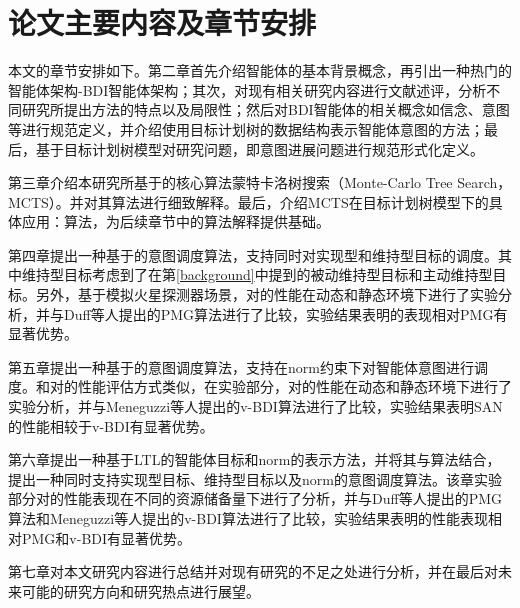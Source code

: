 \section{论文主要内容及章节安排}
本文的章节安排如下。第二章首先介绍智能体的基本背景概念，再引出一种热门的智能体架构-BDI智能体架构；其次，对现有相关研究内容进行文献述评，分析不同研究所提出方法的特点以及局限性；然后对BDI智能体的相关概念如信念、意图等进行规范定义，并介绍使用目标计划树的数据结构表示智能体意图的方法；最后，基于目标计划树模型对研究问题，即意图进展问题进行规范形式化定义。

第三章介绍本研究所基于的核心算法蒙特卡洛树搜索（Monte-Carlo Tree Search，MCTS）。并对其算法进行细致解释。最后，介绍MCTS在目标计划树模型下的具体应用：\SA 算法，为后续章节中的算法解释提供基础。

第四章提出一种基于\SA 的意图调度算法\SAM ，\SAM 支持同时对实现型和维持型目标的调度。其中维持型目标考虑到了在第\ref{background}中提到的被动维持型目标和主动维持型目标。另外，基于模拟火星探测器场景，对\SAM 的性能在动态和静态环境下进行了实验分析，并与Duff等人提出的PMG\cite{DBLP:conf/atal/DuffHT06}算法进行了比较，实验结果表明\SAM 的表现相对PMG有显著优势。

第五章提出一种基于\SA 的意图调度算法\SAN ，\SAN 支持在norm约束下对智能体意图进行调度。和对\SAM 的性能评估方式类似，在实验部分，对\SAN 的性能在动态和静态环境下进行了实验分析，并与Meneguzzi等人提出的v-BDI\cite{}算法进行了比较，实验结果表明SAN的性能相较于v-BDI有显著优势。

第六章提出一种基于LTL的智能体目标和norm的表示方法，并将其与\SA 算法结合，提出一种同时支持实现型目标、维持型目标以及norm的意图调度算法\SAT。该章实验部分对\SAT 的性能表现在不同的资源储备量下进行了分析，并与Duff等人提出的PMG\cite{DBLP:conf/atal/DuffHT06}算法和Meneguzzi等人提出的v-BDI算法进行了比较，实验结果表明\SAT 的性能表现相对PMG和v-BDI有显著优势。

第七章对本文研究内容进行总结并对现有研究的不足之处进行分析，并在最后对未来可能的研究方向和研究热点进行展望。
